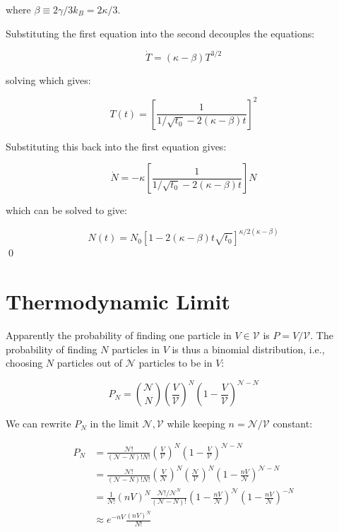 \documentclass[12pt]{article}
\begin{document}
where $\beta \equiv 2\gamma/3k_{B} = 2\kappa/3$.

Substituting the first equation into the second decouples the equations:

\begin{equation}
    \dot{T} = (\kappa - \beta) T^{3/2}
\end{equation}

solving which gives:

\begin{equation}
    T(t) = \left[ \frac{1}{1/\sqrt{t_{0}} - 2(\kappa - \beta) t} \right]^{2}
\end{equation}

Substituting this back into the first equation gives:

\begin{equation}
    \dot{N} = -\kappa \left[ \frac{1}{1/\sqrt{t_{0}} - 2(\kappa - \beta) t} \right] N
\end{equation}

which can be solved to give:

\begin{equation}
    N(t) = N_{0} \left[ 1 - 2(\kappa - \beta) t \sqrt{t_{0}} \right]^{\kappa/2(\kappa - \beta)}
\end{equation}
\qed


\pagebreak
\section*{Thermodynamic Limit}


Apparently the probability of finding one particle in $V \in \mathcal{V}$ is $P = V/\mathcal{V}$. The probability of finding $N$ particles in $V$ is thus a binomial distribution, i.e., choosing $N$ particles out of $\mathcal{N}$ particles to be in $V$:

\begin{equation}
    P_{N} = \binom{\mathcal{N}}{N} \left( \frac{V}{\mathcal{V}} \right)^{N} \left( 1 - \frac{V}{\mathcal{V}} \right)^{\mathcal{N} - N}
\end{equation}

We can rewrite $P_{N}$ in the limit $\mathcal{N}, \mathcal{V}$ while keeping $n = \mathcal{N}/\mathcal{V}$ constant:

\begin{equation}
    \begin{split}
        P_{N} &= \frac{\mathcal{N}!}{(\mathcal{N} - N)! N!} \left( \frac{V}{\mathcal{V}} \right)^{N} \left( 1 - \frac{V}{\mathcal{V}} \right)^{\mathcal{N} - N} \\
        &= \frac{\mathcal{N}!}{(\mathcal{N} - N)! N!} \left( \frac{V}{\mathcal{N}} \right)^{N} \left( \frac{\mathcal{N}}{\mathcal{V}} \right)^{N} \left( 1 - \frac{nV}{\mathcal{N}} \right)^{\mathcal{N} - N} \\
        &= \frac{1}{N!} (nV)^{N} \frac{\mathcal{N}!/\mathcal{N}^{N}}{(\mathcal{N} - N)!} \left( 1 - \frac{nV}{\mathcal{N}} \right)^{\mathcal{N}} \left( 1 - \frac{nV}{\mathcal{N}} \right)^{-N} \\
        &\approx e^{-nV} \frac{(nV)^{N}}{N!}
    \end{split}
\end{equation}
\end{document}
